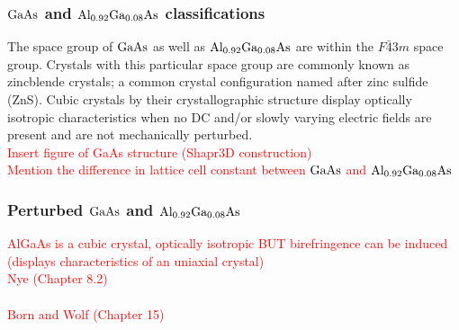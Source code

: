 

\subsubsection{$\mathrm{GaAs}$ and $\mathrm{Al_{0.92}Ga_{0.08}As}$ classifications}
The space group of $\mathrm{GaAs}$ as well as $\mathrm{Al_{0.92}Ga_{0.08}As}$ are within the $F\bar{4}3m$ space group. Crystals with this particular space group are commonly known as zincblende crystals; a common crystal configuration named after zinc sulfide (ZnS). Cubic crystals by their crystallographic structure display optically isotropic characteristics when no DC and/or slowly varying electric fields are present and are not mechanically perturbed.
\\
\textcolor{red}{Insert figure of GaAs structure (Shapr3D construction)}
\\
\textcolor{red}{Mention the difference in lattice cell constant between $\mathrm{GaAs}$ and $\mathrm{Al_{0.92}Ga_{0.08}As}$}
\\
\subsubsection{Perturbed $\mathrm{GaAs}$ and $\mathrm{Al_{0.92}Ga_{0.08}As}$}
\textcolor{red}{AlGaAs is a cubic crystal, optically isotropic BUT birefringence can be induced (displays characteristics of an uniaxial crystal)}
\\
\textcolor{red}{Nye (Chapter 8.2)}
\\
\\
\textcolor{red}{Born and Wolf (Chapter 15)}
\\
